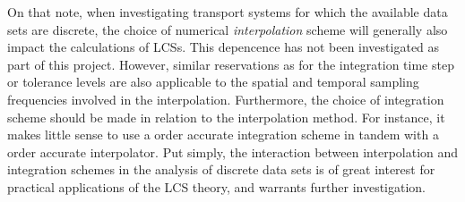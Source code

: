 On that note, when investigating transport systems for which the available
data sets are discrete, the choice of numerical \emph{interpolation} scheme
will generally also impact the calculations of LCSs. This depencence has not
been investigated as part of this project. However, similar reservations
as for the integration time step or tolerance levels are also applicable to
the spatial and temporal sampling frequencies involved in the interpolation.
Furthermore, the choice of integration scheme should be made in relation
to the interpolation method. For instance, it makes little sense to use a
 order accurate integration scheme in tandem with a  order
accurate interpolator. Put simply, the interaction between interpolation
and integration schemes in the analysis of discrete data sets is of great
interest for practical applications of the LCS theory, and warrants
further investigation.
